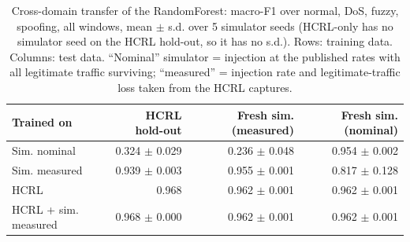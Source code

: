 \begin{table}[t]
\centering
\footnotesize
\caption{Cross-domain transfer of the RandomForest: macro-F1 over {normal, DoS, fuzzy, spoofing}, all windows, mean $\pm$ s.d. over 5 simulator seeds (HCRL-only has no simulator seed on the HCRL hold-out, so it has no s.d.). Rows: training data. Columns: test data. ``Nominal'' simulator = injection at the published rates with all legitimate traffic surviving; ``measured'' = injection rate and legitimate-traffic loss taken from the HCRL captures.}
\label{tab:hcrl_transfer_all}
\begin{tabular}{lrrr}
\toprule
Trained on & HCRL hold-out & Fresh sim. (measured) & Fresh sim. (nominal) \\
\midrule
Sim. nominal & 0.324 $\pm$ 0.029 & 0.236 $\pm$ 0.048 & 0.954 $\pm$ 0.002 \\
Sim. measured & 0.939 $\pm$ 0.003 & 0.955 $\pm$ 0.001 & 0.817 $\pm$ 0.128 \\
HCRL & 0.968 & 0.962 $\pm$ 0.001 & 0.962 $\pm$ 0.001 \\
HCRL + sim. measured & 0.968 $\pm$ 0.000 & 0.962 $\pm$ 0.001 & 0.962 $\pm$ 0.001 \\
\bottomrule
\end{tabular}
\end{table}
